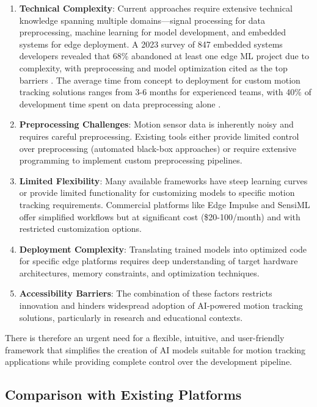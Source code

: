 \begin{enumerate}
\item \textbf{Technical Complexity}: Current approaches require extensive technical knowledge spanning multiple domains—signal processing for data preprocessing, machine learning for model development, and embedded systems for edge deployment. A 2023 survey of 847 embedded systems developers revealed that 68\% abandoned at least one edge ML project due to complexity, with preprocessing and model optimization cited as the top barriers \cite{merenda2020edge}. The average time from concept to deployment for custom motion tracking solutions ranges from 3-6 months for experienced teams, with 40\% of development time spent on data preprocessing alone \cite{warden2019tinyml}.

\item \textbf{Preprocessing Challenges}: Motion sensor data is inherently noisy and requires careful preprocessing. Existing tools either provide limited control over preprocessing (automated black-box approaches) or require extensive programming to implement custom preprocessing pipelines.

\item \textbf{Limited Flexibility}: Many available frameworks have steep learning curves or provide limited functionality for customizing models to specific motion tracking requirements. Commercial platforms like Edge Impulse and SensiML offer simplified workflows but at significant cost (\$20-100/month) and with restricted customization options.

\item \textbf{Deployment Complexity}: Translating trained models into optimized code for specific edge platforms requires deep understanding of target hardware architectures, memory constraints, and optimization techniques.

\item \textbf{Accessibility Barriers}: The combination of these factors restricts innovation and hinders widespread adoption of AI-powered motion tracking solutions, particularly in research and educational contexts.

\end{enumerate}

There is therefore an urgent need for a flexible, intuitive, and user-friendly framework that simplifies the creation of AI models suitable for motion tracking applications while providing complete control over the development pipeline.

\subsection{Comparison with Existing Platforms}

